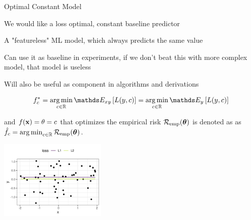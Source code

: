 \documentclass[11pt,compress,t,notes=noshow, xcolor=table]{beamer}
\begin{document}
\begin{vbframe}{Optimal Constant Model}

\begin{itemize}
{\footnotesize
\item We would like a loss optimal, constant baseline predictor
\item A "featureless" ML model, which always predicts the same value
\item Can use it as baseline in experiments, if we don't beat this
with more complex model, that model is useless
\item Will also be useful as component in algorithms and derivations
}
\end{itemize}



$$f_{c}^{\ast} = \argmin_{c \in \mathbb{R}} \E_{xy} \left[L(y,c)\right] = \argmin_{c \in \mathbb{R}} \E_{y} \left[L(y,c)\right]$$

{\footnotesize and $f(\mathbf{x}) = \theta = c$ that optimizes the empirical risk $\mathcal{R}_{\text{emp}}(\bm{\theta})$ is denoted as as $\hat{f}_c = \operatorname*{arg\,min}_{c \in \mathbb{R}} \mathcal{R}_{\text{emp}}(\bm{\theta})$.}

\vspace*{-0.2cm}

\begin{center}
	\includegraphics[width = 0.38\textwidth]{figure/l1_vs_l2.png}
\end{center}
\end{vbframe}
\end{document}
